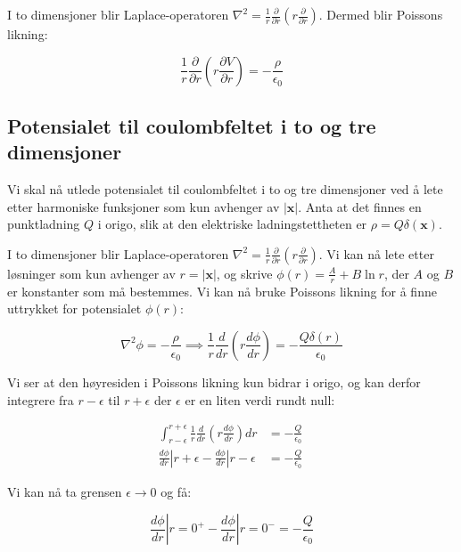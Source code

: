 I to dimensjoner blir Laplace-operatoren $\nabla^2 = \frac{1}{r}\frac{\partial}{\partial r}\left(r\frac{\partial}{\partial r}\right)$. Dermed blir Poissons likning:

\begin{equation*}
    \frac{1}{r} \frac{\partial}{\partial r}\left(r \frac{\partial V}{\partial r}\right)=-\frac{\rho}{\epsilon_{0}}
\end{equation*}

\subsection*{Potensialet til coulombfeltet i to og tre dimensjoner}
Vi skal nå utlede potensialet til coulombfeltet i to og tre dimensjoner ved å lete etter harmoniske funksjoner som kun avhenger av $|\mathbf{x}|$. Anta at det finnes en punktladning $Q$ i origo, slik at den elektriske ladningstettheten er $\rho = Q\delta(\mathbf{x})$.

I to dimensjoner blir Laplace-operatoren $\nabla^2 = \frac{1}{r}\frac{\partial}{\partial r}\left(r\frac{\partial}{\partial r}\right)$. Vi kan nå lete etter løsninger som kun avhenger av $r=|\mathbf{x}|$, og skrive $\phi(r) = \frac{A}{r} + B\ln r$, der $A$ og $B$ er konstanter som må bestemmes. Vi kan nå bruke Poissons likning for å finne uttrykket for potensialet $\phi(r)$:

\begin{equation*}
\nabla^2 \phi = -\frac{\rho}{\epsilon_0} \implies \frac{1}{r}\frac{d}{dr}\left(r\frac{d\phi}{dr}\right) = -\frac{Q\delta(r)}{\epsilon_0}
\end{equation*}

Vi ser at den høyresiden i Poissons likning kun bidrar i origo, og kan derfor integrere fra $r-\epsilon$ til $r+\epsilon$ der $\epsilon$ er en liten verdi rundt null:

\begin{align*}
\int_{r-\epsilon}^{r+\epsilon}\frac{1}{r}\frac{d}{dr}\left(r\frac{d\phi}{dr}\right)dr &= -\frac{Q}{\epsilon_0} \\
\left.\frac{d\phi}{dr}\right|{r+\epsilon} - \left.\frac{d\phi}{dr}\right|{r-\epsilon} &= -\frac{Q}{\epsilon_0} \
\end{align*}

Vi kan nå ta grensen $\epsilon \rightarrow 0$ og få:

\begin{equation*}
\left.\frac{d\phi}{dr}\right|{r=0^+} - \left.\frac{d\phi}{dr}\right|{r=0^-} = -\frac{Q}{\epsilon_0}
\end{equation*}

